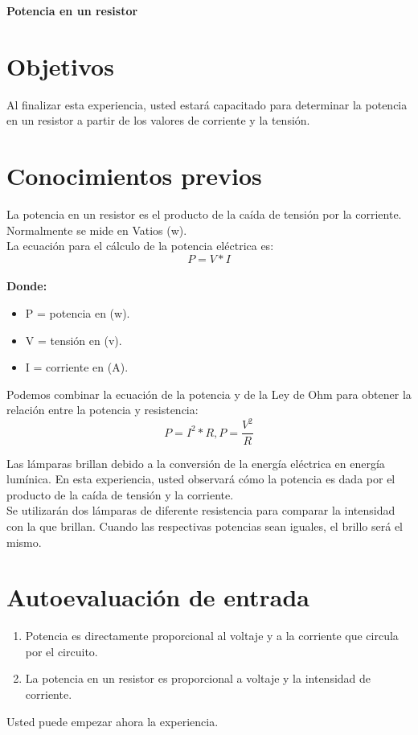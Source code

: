 \thispagestyle{fancy}
\begin{center}
	\LARGE{\textbf{Potencia en un resistor}}
\end{center}
\section{Objetivos}
Al finalizar esta experiencia, usted estará capacitado para determinar la potencia en un resistor a partir de los valores de corriente y la tensión.
\section{Conocimientos previos}
La potencia en un resistor es el producto de la caída de tensión por la corriente. Normalmente se mide en Vatios (w).
\\
La ecuación para el cálculo de la potencia eléctrica es:
\begin{equation*}
	P=V*I
\end{equation*}
\\
\textbf{Donde:}
\begin{itemize}
	\item P = potencia en (w).
	\item V = tensión en (v).
	\item I = corriente en (A).
\end{itemize}
Podemos combinar la ecuación de la potencia y de la Ley de Ohm para obtener la relación entre la potencia y resistencia:
\begin{equation*}
	P = I^2 * R, P= \frac{V^2}{R}
\end{equation*}

Las lámparas brillan debido a la conversión de la energía eléctrica en energía lumínica. En esta experiencia, usted observará cómo la potencia es dada por el producto de la caída de tensión y la corriente.
\\
Se utilizarán dos lámparas de diferente resistencia para comparar la intensidad con la que brillan. Cuando las respectivas potencias sean iguales, el brillo será el mismo.
\section{Autoevaluación de entrada}
\begin{enumerate}
	\item Potencia es directamente proporcional al voltaje y a la corriente que circula por el circuito.
	\item La potencia en  un resistor es proporcional a voltaje y la intensidad de corriente.

\end{enumerate}
Usted puede empezar ahora la experiencia.
